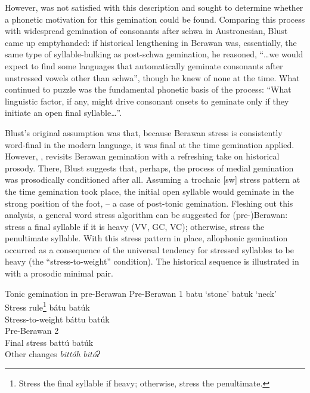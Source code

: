 \documentclass[output=paper]{langscibook}
\begin{document}
However, \citet{Blust2005} was not satisfied with this description and sought to determine whether a phonetic motivation for this gemination could be found. Comparing this process with widespread gemination of consonants after schwa in Austronesian, Blust came up emptyhanded: if historical lengthening in Berawan was, essentially, the same type of syllable-bulking as post-schwa gemination, he reasoned, “…we would expect to find some languages that automatically geminate consonants after unstressed vowels other than schwa”, though he knew of none at the time. What continued to puzzle \citet[252]{Blust2005} was the fundamental phonetic basis of the process: “What linguistic factor, if any, might drive consonant onsets to geminate only if they initiate an open final syllable…”. 


Blust’s original assumption was that, because Berawan stress is consistently word-final in the modern language, it was final at the time gemination applied. However, \citet{Blust2018}, revisits Berawan gemination with a refreshing take on historical prosody. There, Blust suggests that, perhaps, the process of medial gemination was prosodically conditioned after all. Assuming a trochaic [sw] stress pattern at the time gemination took place, the initial open syllable would geminate in the strong position of the foot, -- a case of post-tonic gemination. Fleshing out this analysis, a general word stress algorithm can be suggested for \mbox{(pre-)}Berawan: stress a final syllable if it is heavy (VV, GC, VC); otherwise, stress the penultimate syllable. With this stress pattern in place, allophonic gemination occurred as a consequence of the universal tendency for stressed syllables to be heavy (the “stress-to-weight” condition). The historical sequence is illustrated in  with a prosodic minimal pair.

\largerpage
\ea%
Tonic gemination in pre-Berawan\label{ex:blevins:14}
    \ea {}
        Pre-Berawan 1         \tab\relax  *batu ‘stone’ \tab\relax   *batuk ‘neck’\\
        \ea {}
            Stress rule\footnote{Stress the final syllable if heavy; otherwise, stress the penultimate.}  
                             \tab\relax *bátu   \tab\relax   *batúk    \\
        \ex Stress-to-weight \tab\relax *báttu  \tab\relax   *batúk     \\
        \z
    \ex 
        Pre-Berawan 2\\
        \ea {}
            Final stress  \tab\relax  *battú             \tab\relax  *batúk\\
        \ex Other changes \tab  \textit{bittóh}    \tab   \textit{bitóʔ}\\
        \z
    \z
\z
\end{document}
